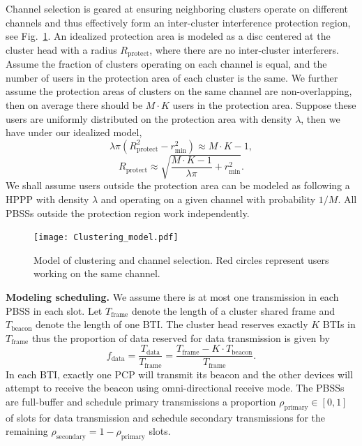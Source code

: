 \documentclass[10pt, conference, letterpaper]{IEEEtran}
\begin{document}
Channel selection is geared at ensuring neighboring clusters operate on different channels and thus effectively form  an inter-cluster interference protection region, see Fig.~\ref{fig:clusteranalysis:model}.
An idealized protection area is modeled as a disc centered at the cluster head with a radius $R_{\mathrm{protect}}$, where there are no inter-cluster interferers.
Assume the fraction of clusters operating on each channel is equal, and the number of users in the protection area of each cluster is the same.
We further assume the protection areas of clusters on the same channel are non-overlapping, then on average there should be $M\cdot K$ users in the protection area. 
Suppose these users are uniformly distributed on the protection area with density $\lambda$, then we have under our idealized model, 
\begin{equation*}
\lambda \pi (R_{\mathrm{protect}}^2 - r_{\min}^2) \approx M\cdot K - 1,
\end{equation*}
\begin{equation*}
R_{\mathrm{protect}} \approx \sqrt{\frac{M\cdot K - 1}{\lambda \pi} + r_{\min}^2}.
\end{equation*}
We shall assume users outside the protection area can be modeled as following a HPPP with density $\lambda$ and operating on a given channel with probability $1/M$.
All PBSSs outside the protection region work independently.
 

\begin{figure}
	\centering
	\texttt{[image: Clustering\_model.pdf]}
	\caption{Model of clustering and channel selection. Red circles represent users working on the same channel.}
	\label{fig:clusteranalysis:model}
\end{figure}


\textbf{Modeling scheduling.}
We assume there is at most one transmission in each PBSS in each slot. 
Let $T_{\mathrm{frame}}$ denote the length of a cluster shared frame and $T_{\mathrm{beacon}}$ denote the length of one BTI. 
The cluster head reserves exactly $K$ BTIs in $T_{\mathrm{frame}}$ thus the proportion of data reserved for data transmission is given by
\begin{equation*}
f_{\mathrm{data}} = \frac{T_{\mathrm{data}}}{T_{\mathrm{frame}}} = \frac{T_{\mathrm{frame}} - K\cdot T_{\mathrm{beacon}}} {T_{\mathrm{frame}}}.
\end{equation*}
In each BTI, exactly one PCP will transmit its beacon and the other devices will attempt to receive the beacon using omni-directional receive mode. 
The PBSSs are full-buffer and schedule primary transmissions a proportion $\rho_{\mathrm{primary}}\in[0,1]$ of slots for data transmission and schedule secondary transmissions for the remaining $\rho_{\mathrm{secondary}} =1 - \rho_{\mathrm{primary}}$  slots. 
\end{document}

